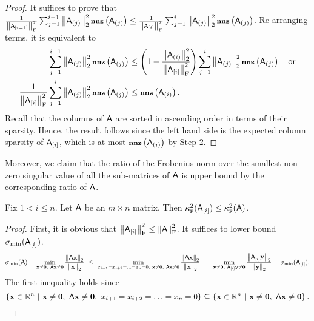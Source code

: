 \begin{proof}
It suffices to prove that $\frac1{\frobnorm{\matA_{[i - 1]}}^2} \sum_{j=1}^{i - 1} \norm{\ac{j} }^2 \nnz{\ac{j}}  \leq  \frac1{\frobnorm{\matA_{[i]}}^2} \sum_{j=1}^{i} \norm{\ac{j} }^2 \nnz{\ac{j}}$. Re-arranging terms, it is equivalent to
\begin{align*}
	\sum_{j=1}^{i - 1} \norm{\ac{j} }^2 \nnz{\ac{j}} & \leq  \left( 1 - \frac{  \norm{\ac{i}}^2 }{\frobnorm{\matA_{[i]} }^2} \right) \sum_{j=1}^{i} \norm{\ac{j} }^2 \nnz{\ac{j}} \quad \text{or}\\
	 \frac1{\frobnorm{\matA_{[i]} }^2}  \sum_{j=1}^{i} \norm{\ac{j} }^2 \nnz{\ac{j}} & \leq  \nnz{\ac{i}}.
\end{align*}
%
Recall that the columns of $\matA$ are sorted in ascending order in terms of their sparsity. Hence, the result follows since the left hand side is the expected column sparsity of $\matA_{[i]}$, which is at most $\nnz{\ac{i}}$ by Step $2$.
\end{proof}
Moreover, we claim that the ratio of the Frobenius norm over the smallest non-zero singular value of all the sub-matrices of $\matA$ is upper bound by the corresponding ratio of $\matA$.
%
%
\begin{lemma}\label{lem:submatrixcond}
%
Fix $1<i\leq n$. Let $\matA$ be an $m\times n$ matrix. Then $\kappaFS(\matA_{[i]}) \leq \kappaFS(\matA)$.
\end{lemma}
%
%
\begin{proof}
First, it is obvious that $\frobnorm{\matA_{[i]}}^2 \leq \frobnorm{\matA}^2$. It suffices to lower bound $\sigma_{\min}(\matA_{[i]})$.
%
\begin{align*}
	\sigma_{\min}(\matA) = \min_{\x\neq \zero,\ \matA\x\neq\zero } \frac{\norm{\matA \x}}{\norm{\x}} \ \leq \ \min_{x_{i+1}=x_{i+2}=\ldots = x_n = 0,\ \x\neq \zero,\ \matA\x\neq\zero } \frac{\norm{\matA \x}}{\norm{\x}}\ = \ \min_{\y\neq \zero,\ \matA_{[i]}\y\neq\zero } \frac{\norm{\matA_{[i]} \y}}{\norm{\y}} = \sigma_{\min}(\matA_{[i]}).
\end{align*}
%
The first inequality holds since
\[\left\{\x\in\RR^n\ |\ \x\neq \zero,\ \matA\x\neq\zero,\ x_{i+1}=x_{i+2}=\ldots =x_n=0 \right\} \subseteq \left\{\x\in\RR^n\ |\ \x\neq \zero,\ \matA\x\neq\zero  \right\}.\]
\end{proof}
%
%

